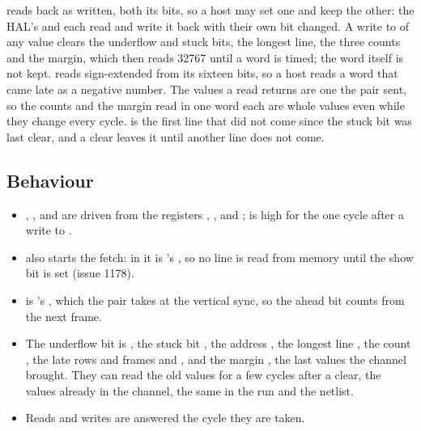 
 reads back as written, both its bits, so a host may set
one and keep the other: the HAL's  and 
each read  and write it back with their own bit changed.
A write to  of any value clears the underflow and stuck
bits, the longest line, the three counts and the margin, which then
reads 32767 until a word is timed; the word itself is not kept.
 reads sign-extended from its sixteen bits, so a host
reads a word that came late as a negative number.
The values a read returns are one  the pair sent, so
the counts and the margin read in one word each are whole values even
while they change every cycle.  is the first line that did not come since
the stuck bit was last clear, and a clear leaves it until another line
does not come.


\subsection*{Behaviour}

\begin{itemize}
\item {}, ,  and  are driven
from the registers , ,  and
;  is high for the one cycle after a write to
.
\item {} also starts the fetch: in  it is
's , so no line is read from memory until
the show bit is set (issue 1178).
\item {} is 's , which the pair takes
at the vertical sync, so the ahead bit counts from the next frame.
\item The underflow bit is , the stuck bit
, the address , the longest line
, the count , the late rows and
frames  and , and the
margin , the last values the channel brought. They can read the old values for a few cycles
after a clear, the values already in the channel, the same in the run
and the netlist.
\item Reads and writes are answered the cycle they are taken.
\end{itemize}

